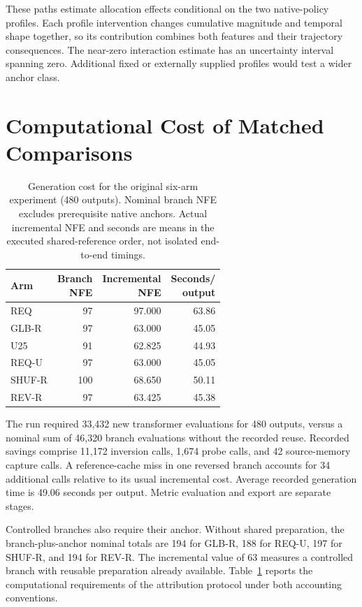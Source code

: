\documentclass[10pt,doubleanonymous]{ieeeconf}
\begin{document}
These paths estimate allocation effects conditional on the two native-policy profiles. Each profile intervention changes cumulative magnitude and temporal shape together, so its contribution combines both features and their trajectory consequences. The near-zero interaction estimate has an uncertainty interval spanning zero. Additional fixed or externally supplied profiles would test a wider anchor class.

\section{Computational Cost of Matched Comparisons}
\begin{table}[!t]
\centering\small
\caption{Generation cost for the original six-arm experiment (480 outputs). Nominal branch NFE excludes prerequisite native anchors. Actual incremental NFE and seconds are means in the executed shared-reference order, not isolated end-to-end timings.}
\label{tab:cost}
\begin{tabular}{lrrr}
\toprule
Arm & \shortstack{Branch\\NFE} & \shortstack{Incremental\\NFE} & \shortstack{Seconds/\\output}\\
\midrule
REQ &97&97.000&63.86\\
GLB-R &97&63.000&45.05\\
U25 &91&62.825&44.93\\
REQ-U &97&63.000&45.05\\
SHUF-R &100&68.650&50.11\\
REV-R &97&63.425&45.38\\
\bottomrule
\end{tabular}
\end{table}

The run required 33,432 new transformer evaluations for 480 outputs, versus a nominal sum of 46,320 branch evaluations without the recorded reuse. Recorded savings comprise 11,172 inversion calls, 1,674 probe calls, and 42 source-memory capture calls. A reference-cache miss in one reversed branch accounts for 34 additional calls relative to its usual incremental cost. Average recorded generation time is 49.06 seconds per output. Metric evaluation and export are separate stages.

Controlled branches also require their anchor. Without shared preparation, the branch-plus-anchor nominal totals are 194 for GLB-R, 188 for REQ-U, 197 for SHUF-R, and 194 for REV-R. The incremental value of 63 measures a controlled branch with reusable preparation already available. Table~\ref{tab:cost} reports the computational requirements of the attribution protocol under both accounting conventions.
\end{document}

